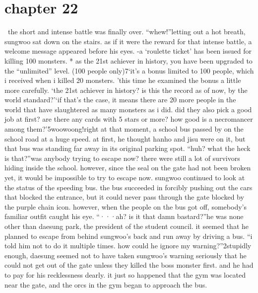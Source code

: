 \section{chapter 22}






 the short and intense battle was finally over.
“whew!”letting out a hot breath, sungwoo sat down on the stairs.
 as if it were the reward for that intense battle, a welcome message appeared before his eyes.
-a ‘roulette ticket’ has been issued for killing 100 monsters.
* as the 21st achiever in history, you have been upgraded to the “unlimited” level.
 (100 people only)7‘it’s a bonus limited to 100 people, which i received when i killed 20 monsters.
’this time he examined the bonus a little more carefully.
‘the 21st achiever in history? is this the record as of now, by the world standard?’‘if that’s the case, it means there are 20 more people in the world that have slaughtered as many monsters as i did.
 did they also pick a good job at first? are there any cards with 5 stars or more? how good is a necromancer among them?’5woowoong!right at that moment, a school bus passed by on the school road at a huge speed.
 at first, he thought hanho and jisu were on it, but that bus was standing far away in its original parking spot.
“huh? what the heck is that?”was anybody trying to escape now? there were still a lot of survivors hiding inside the school.
 however, since the seal on the gate had not been broken yet, it would be impossible to try to escape now.
sungwoo continued to look at the status of the speeding bus.
 the bus succeeded in forcibly pushing out the cars that blocked the entrance, but it could never pass through the gate blocked by the purple chain icon.
 however, when the people on the bus got off, somebody’s familiar outfit caught his eye.
“···ah? is it that damn bastard?”he was none other than daesung park, the president of the student council.
it seemed that he planned to escape from behind sungwoo’s back and run away by driving a bus.
“i told him not to do it multiple times.
 how could he ignore my warning?”2stupidly enough, daesung seemed not to have taken sungwoo’s warning seriously that he could not get out of the gate unless they killed the boss monster first.
and he had to pay for his recklessness dearly.
 it just so happened that the gym was located near the gate, and the orcs in the gym began to approach the bus.

